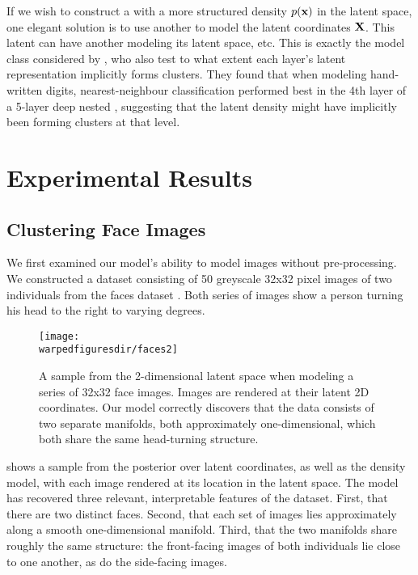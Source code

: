 If we wish to construct a \gplvm{} with a more structured density $p({\bf{x}})$ in the latent space, one elegant solution is to use another \gplvm{} to model the latent coordinates $\mathbf{X}$.
This latent \gplvm{} can have another \gplvm{} modeling its latent space, etc.
This is exactly the model class considered by \cite{damianou2012deep}, who also test to what extent each layer's latent representation implicitly forms clusters.
They found that when modeling \MNIST{} hand-written digits, nearest-neighbour classification performed best in the 4th layer of a 5-layer deep nested \gplvm{}, suggesting that the latent density might have implicitly been forming clusters at that level.




\section{Experimental Results}
\label{sec:iwmm-experiments}

\subsection{Clustering Face Images}

We first examined our model's ability to model images without pre-processing.
We constructed a dataset consisting of 50 greyscale 32x32 pixel images of two individuals from the \UMIST{} faces dataset \citep{umistfaces}.
Both series of images show a person turning his head to the right to varying degrees.

\begin{figure}[h!]
\centering
\texttt{[image: \\warpedfiguresdir/faces2]}
\caption[Latent clusters of face images]{A sample from the 2-dimensional latent space when modeling a series of 32x32 face images.
Images are rendered at their latent 2D coordinates.
Our model correctly discovers that the data consists of two separate manifolds, both approximately one-dimensional, which both share the same head-turning structure.}
\label{fig:faces}
\end{figure}

 shows a sample from the posterior over latent coordinates, as well as the density model, with each image rendered at its location in the latent space.
The model has recovered three relevant, interpretable features of the dataset.
First, that there are two distinct faces.
Second, that each set of images lies approximately along a smooth one-dimensional manifold.
Third, that the two manifolds share roughly the same structure: the front-facing images of both individuals lie close to one another, as do the side-facing images.


